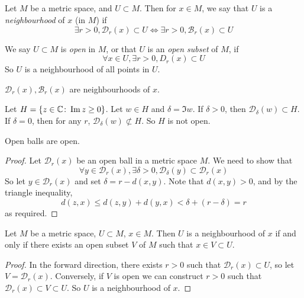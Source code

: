\subsection{}
\begin{definition}
	Let \( M \) be a metric space, and \( U \subset M \).
	Then for \( x \in M \), we say that \( U \) is a \textit{neighbourhood} of \( x \) (in \( M \)) if
	\[
		\exists r > 0, \mathcal D_r(x) \subset U \iff \exists r > 0, \mathcal B_r(x) \subset U
	\]
\end{definition}
\begin{definition}
	We say \( U \subset M \) is \textit{open} in \( M \), or that \( U \) is an \textit{open subset} of \( M \), if
	\[
		\forall x \in U, \exists r > 0, D_r(x) \subset U
	\]
	So \( U \) is a neighbourhood of all points in \( U \).
\end{definition}
\begin{example}
	\( \mathcal D_r(x), \mathcal B_r(x) \) are neighbourhoods of \( x \).
\end{example}
\begin{example}
	Let \( H = \qty{ z \in \mathbb C \colon \Im z \geq 0 } \).
	Let \( w \in H \) and \( \delta = \Im w \).
	If \( \delta > 0 \), then \( \mathcal D_\delta(w) \subset H \).
	If \( \delta = 0 \), then for any \( r \), \( \mathcal D_\delta(w) \not\subset H \).
	So \( H \) is not open.
\end{example}
\begin{lemma}
	Open balls are open.
\end{lemma}
\begin{proof}
	Let \( \mathcal D_r(x) \) be an open ball in a metric space \( M \).
	We need to show that
	\[
		\forall y \in \mathcal D_r(x), \exists \delta > 0, \mathcal D_\delta(y) \subset \mathcal D_r(x)
	\]
	So let \( y \in \mathcal D_r(x) \) and set \( \delta = r - d(x,y) \).
	Note that \( d(x,y) > 0 \), and by the triangle inequality,
	\[
		d(z,x) \leq d(z,y) + d(y,x) < \delta + (r-\delta) = r
	\]
	as required.
\end{proof}
\begin{corollary}
	Let \( M \) be a metric space, \( U \subset M \), \( x \in M \).
	Then \( U \) is a neighbourhood of \( x \) if and only if there exists an open subset \( V \) of \( M \) such that \( x \in V \subset U \).
\end{corollary}
\begin{proof}
	In the forward direction, there exists \( r > 0 \) such that \( \mathcal D_r(x) \subset U \), so let \( V = \mathcal D_r(x) \).
	Conversely, if \( V \) is open we can construct \( r > 0 \) such that \( \mathcal D_r(x) \subset V \subset U \).
	So \( U \) is a neighbourhood of \( x \).
\end{proof}

